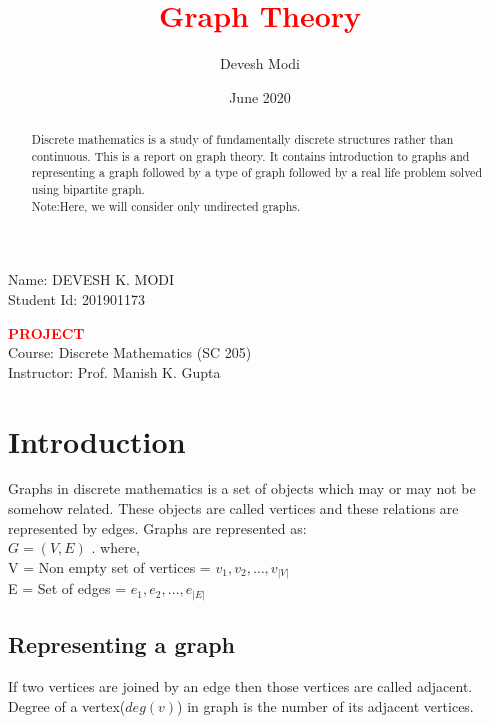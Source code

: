 \documentclass{article}
\title{\bf \textcolor{red}{Graph Theory}}
\author{Devesh Modi}
\date{June 2020}
\begin{document}
\begin{flushleft}   %
Name: DEVESH K. MODI \\
Student Id: 201901173
\end{flushleft}

\vspace{8cm}

\begin{center}
\huge { \bf \textcolor{red} {PROJECT \\} }
Course: Discrete Mathematics (SC 205) \\
Instructor: Prof. Manish K. Gupta \\
\end{center}

\newpage

\maketitle

\tableofcontents

\begin{abstract}
Discrete mathematics is a study of fundamentally discrete structures rather than continuous. This is a report on graph theory. It contains introduction to graphs and representing a graph followed by a type of graph followed by a real life problem solved \cite{myref} using bipartite graph.\\Note:Here, we will consider only undirected graphs. 
\end{abstract}

\vspace{1cm}

\section{Introduction}
Graphs in discrete mathematics is a set of objects which may or may not be somehow related. These objects are called vertices and these relations are represented by edges. Graphs are represented as: \\ $G = (V,E)$ . where, \\ V = Non empty set of vertices = ${v_1,v_2,\dots,v_{|V|}}$ \\ E = Set of edges = ${e_1,e_2,\dots,e_{|E|}}$

\subsection{Representing a graph}
If two vertices are joined by an edge then those vertices are called adjacent. Degree of a vertex($deg(v)$) in graph is the number of its adjacent vertices.
\end{document}
